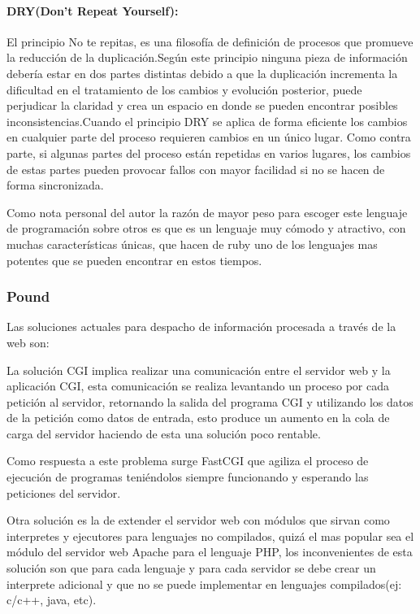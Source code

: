 \paragraph{DRY(Don't Repeat Yourself):}
El principio No te repitas, es una filosofía de definición de procesos que promueve la reducción de la duplicación.\newline Según este principio ninguna pieza de información debería estar en dos partes distintas debido a que la duplicación incrementa la dificultad en el tratamiento de los cambios y evolución posterior, puede perjudicar la claridad y crea un espacio en donde se pueden encontrar posibles inconsistencias.\newline Cuando el principio DRY se aplica de forma eficiente los cambios en cualquier parte del proceso requieren cambios en un único lugar. Como contra parte, si algunas partes del proceso están repetidas en varios lugares, los cambios de estas partes pueden provocar fallos con mayor facilidad si no se hacen de forma sincronizada.

Como nota personal del autor la razón de mayor peso para escoger este lenguaje de programación sobre otros es que es un lenguaje muy cómodo y atractivo, con muchas características únicas, que hacen de ruby uno de los lenguajes mas potentes que se pueden encontrar en estos tiempos.


\subsubsection*{Pound \cite{pound} }

Las soluciones actuales para despacho de información procesada a través de la web son:

La solución CGI implica realizar una comunicación entre el servidor web y la aplicación CGI, esta comunicación se realiza levantando un proceso por cada petición al servidor, retornando la salida del programa CGI y utilizando los datos de la petición como datos de entrada, esto produce un aumento en la cola de carga del servidor haciendo de esta una solución poco rentable.

Como respuesta a este problema surge FastCGI que agiliza el proceso de ejecución de programas teniéndolos siempre funcionando y esperando las peticiones del servidor.

Otra solución es la de extender el servidor web con módulos que sirvan como interpretes y ejecutores para lenguajes no compilados, quizá el mas popular sea el módulo del servidor web Apache para el lenguaje PHP, los inconvenientes de esta solución son que para cada lenguaje y para cada servidor se debe crear un interprete adicional y que no se puede implementar en lenguajes compilados(ej: c/c++, java, etc).

